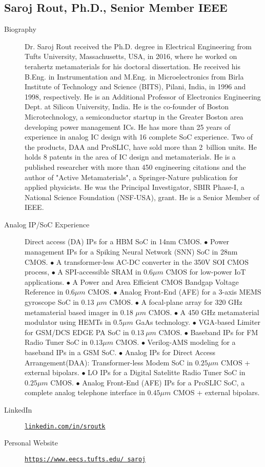 \documentclass[12pt]{article}
\begin{document}
\subsection*{Saroj Rout, Ph.D., Senior Member IEEE}
\begin{description}
    \item[Biography] Dr. Saroj Rout received the Ph.D. degree in Electrical Engineering from Tufts University, Massachusetts, USA, in 2016, where he worked on terahertz metamaterials for his doctoral dissertation. He received his B.Eng. in Instrumentation and M.Eng. in Microelectronics from Birla Institute of Technology and Science (BITS), Pilani, India, in 1996 and 1998, respectively.
    He is an Additional Professor of Electronics Engineering Dept. at Silicon University, India. He is the co-founder of Boston Microtechnology, a semiconductor startup in the Greater Boston area developing power management ICs. He has more than 25 years of experience in analog IC design with 16 complete SoC experience. Two of the products, DAA and ProSLIC, have sold more than 2~billion units. He holds 8 patents in the area of IC design and metamaterials. He is a published researcher with more than 450 engineering citations and the author of "Active Metamaterials", a Springer-Nature publication for applied physicists. He was the Principal Investigator, SBIR Phase-I, a National Science Foundation (NSF-USA), grant. He is a Senior Member of IEEE.

    \item[Analog IP/SoC Experience] Direct access (DA) IPs for a HBM SoC in 14nm CMOS. $\bullet$ Power management IPs for a Spiking Neural Network (SNN) SoC in 28nm CMOS. $\bullet$ A transformer-less AC-DC converter in the 350V SOI CMOS process, $\bullet$ A SPI-accessible SRAM in 0.6$\mu m$ CMOS for low-power IoT applications. $\bullet$ A Power and Area Efficient CMOS Bandgap Voltage Reference in 0.6$\mu m$ CMOS. $\bullet$ Analog Front-End (AFE) for a 3-axis MEMS gyroscope SoC in 0.13 $\mu m$ CMOS. $\bullet$ A focal-plane array for 320 GHz metamaterial based imager in 0.18 $\mu m$ CMOS. $\bullet$ A 450 GHz metamaterial modulator using HEMTs in 0.5$\mu m$ GaAs technology. $\bullet$ VGA-based Limiter for GSM/DCS EDGE PA SoC in $0.13~\mu m$ CMOS. $\bullet$ Baseband IPs for FM Radio Tuner SoC in $0.13\mu m$ CMOS. $\bullet$ Verilog-AMS modeling for a baseband IPs in a GSM SoC. $\bullet$ Analog IPs for Direct Access Arrangement(DAA): Transformer-less Modem SoC in $0.25\mu m$ CMOS + external bipolars. $\bullet$ LO IPs for a Digital Satelitte Radio Tuner SoC in $0.25\mu m$ CMOS. $\bullet$ Analog Front-End (AFE) IPs for a ProSLIC SoC, a complete analog telephone interface in $0.45\mu m$ CMOS + external bipolars.

    \item[LinkedIn] \href{https://linkedin.com/in/sroutk}{\texttt{linkedin.com/in/sroutk}}

    \item[Personal Website]  \href{https://www.eecs.tufts.edu/~saroj}{\texttt{https://www.eecs.tufts.edu/~saroj}}

\end{description}
\end{document}
